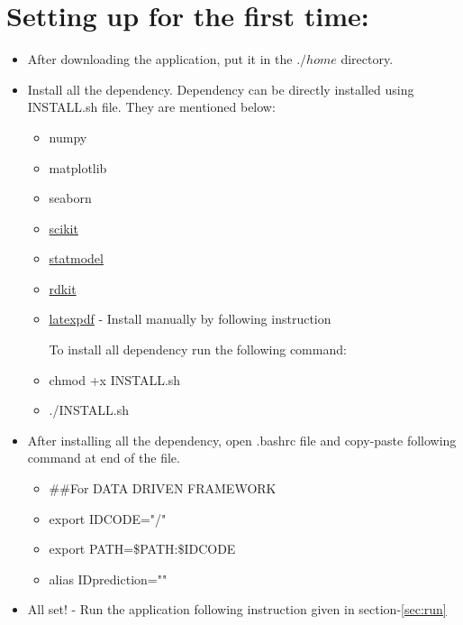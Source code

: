 \documentclass[12pt]{article}
\begin{document}
\section{Setting up for the first time:} \label{sec:setup}
{
	\begin{itemize}
		\item After downloading the application, put it in the $./home$ directory. 
		\item Install all the dependency. Dependency can be directly installed using INSTALL.sh file. They are mentioned below: 
		\begin{itemize}
		\item numpy
		\item matplotlib
		\item seaborn
		\item \href{https://scikit-learn.org/stable/install.html}{scikit}
		\item \href{https://www.statsmodels.org/stable/install.html}{statmodel}
		\item \href{https://www.rdkit.org/docs/Install.html}{rdkit}
		\item \href{https://gist.github.com/rain1024/98dd5e2c6c8c28f9ea9d}{latexpdf} - Install manually by following instruction

	\vspace{0.5cm}
	
		To install all dependency run the following command:
		\item chmod +x INSTALL.sh
		\item ./INSTALL.sh
		
		\end{itemize}
		
		\item After installing all the dependency, open .bashrc file and copy-paste following command at end of the file.
		
		\begin{itemize}
			\item $\#\#$For DATA DRIVEN FRAMEWORK
			\item export IDCODE="/"
			\item export PATH=\$PATH:\$IDCODE
			\item alias IDprediction=""
		\end{itemize}
	\item All set! - Run the application following instruction given in section-\ref{sec:run}
	\end{itemize}
		
}
\end{document}

